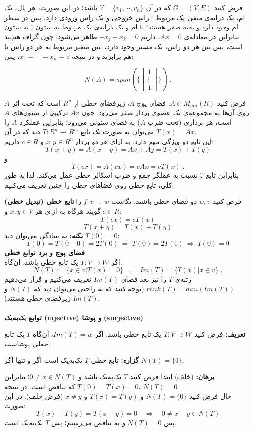 فرض کنید $G=(V,E)$ که در آن $V=\{v_1,\cdots,v_n\}$ باشد؛ در این صورت، هر یال، یک راس خروجی و یک راس ورودی دارد، پس در سطر i ام، یک درایه‌ی منفی یک مربوط به ستون j ام و یک درایه‌ی یک مربوط به ستون k ام وجود دارد و بقیه صفر هستند؛ بنابراین در معادله‌ی $Ax=0$، داریم $-x_j+x_k=0$ ظاهر می‌شود. چون گراف هم‌بند است، پس بین هر دو راس، یک مسیر وجود دارد، پس متغیر مربوط به هر دو راس با هم برابرند و در نتیجه $x_1=\cdots = x_n = c$، پس:

$$ N(A) = span(\{\begin{bmatrix}
1\\ \vdots \\ 1
\end{bmatrix}\}) \; .$$ 

فرض کنید $A\in M_{mn}(R)$. فضا‌ی پوچ $A$، زیر‌فضا‌ی خطی از $R^n$ است که تحت اثر $A$ روی آن‌ها به مجموعه‌ی تک عضوی بردار صفر می‌رود. چون $Ax$ ترکیبی از ستون‌های $A$ است، هر برداری (تحت ضرب $A$) به فضا‌ی ستونی می‌رود؛ بنابراین عملکرد $A$ را می‌توان به صورت یک تابع $T:R^n\rightarrow R^m$ دید که در آن $T(x)=Ax$.\\
این تابع دو ویژگی مهم دارد. به ازای هر دو بردار $x,y\in R^n$ و $c\in R$ داریم:
$$T(x+y) = A(x+y) = Ax+Ay = T(x)+T(y)$$
و
$$T(cx) = A(cx) = cAx = cT(x) \; .$$
بنابراین تابع $T$ نسبت به عملگر جمع و ضرب اسکالر خطی عمل می‌کند. لذا به طور کلی، تابع خطی روی فضا‌های خطی را چنین تعریف می‌کنیم:

فرض کنید $w,v$ دو فضا‌ی خطی باشند. نگاشت $f:v\rightarrow w$ را \textbf{تابع خطی (تبدیل خطی)} گویند هرگاه به ازای هر $x,y\in V$ و $c\in R$:
$$T(cx) = cT(x)$$
$$T(x+y)=T(x)+T(y)$$
\textbf{نکته:}
به سادگی می‌توان دید $T(0) = 0$:
$$T(0) = T(0+0) = 2T(0) \: \Rightarrow \: T(0) = 2T(0) \: \Rightarrow \: T(0) = 0$$
\textbf{فضا‌ی پوچ و برد توابع خطی}\\
اگر $T:V\rightarrow W$ یک تابع خطی باشد، آن‌گاه:
$$N(T):=\{x\in v| T(x) = 0\} \quad,\quad Im(T)= \{ T(x)|x\in v\} \; .$$
رتبه‌ی $T$ را نیز بعد فضا‌ی $Im(T)$ تعریف می‌کنیم و قرار می‌دهیم $rank(T) = dim(Im(T))$ (توجه کنید که به راحتی می‌توان دید که $N(T)$ و $Im(T)$ زیر‌فضا‌ی خطی هستند).\\\\
\textbf{توابع یک‌به‌یک (injective) و پوشا (surjective)}

\textbf{تعریف:}
فرض کنید $T: V\rightarrow W$ یک تابع خطی باشد. اگر $Im(T)=w$، آن‌گاه $T$ یک تابع خطی پوشاست.

\textbf{گزاره:}
تابع خطی $T$ یک‌به‌یک است اگر و تنها اگر $N(T)=\{0\}$.

\textbf{برهان:}
(خلف) ابتدا فرض کنید $T$ یک‌به‌یک باشد و $0\neq x \in N(T)$؛ بنابراین $T(0)=T(x)=0$ که تناقض است. در نتیجه، $N(T)=0$.\\
حال فرض کنید $N(T)=\{0\}$ و $T(x)=T(y)$ و $x \neq y$ (فرض خلف). در این صورت:
$$T(x)-T(y) = T(x-y) = 0\quad \Rightarrow \quad 0\neq x-y \in N(T)$$
پس $N(T)=0$ و به تناقض می‌رسیم؛ پس $T$ یک‌به‌یک است.

